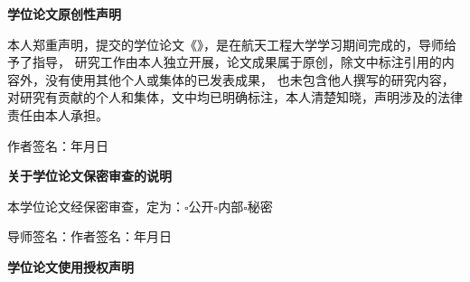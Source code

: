 \thispagestyle{empty}

\begin{center}
{\heiti\bfseries{} 学位论文原创性声明}
\end{center}

\vspace{0.3cm}

\kaishu{}
\setlength{\parindent}{2em}

本人郑重声明，提交的学位论文《\thesistitle》，是在航天工程大学学习期间完成的，导师给予了指导，
研究工作由本人独立开展，论文成果属于原创，除文中标注引用的内容外，没有使用其他个人或集体的已发表成果，
也未包含他人撰写的研究内容，对研究有贡献的个人和集体，文中均已明确标注，本人清楚知晓，声明涉及的法律责任由本人承担。

\vspace{0.8cm}

\begin{center}
\kaishu{}
作者签名：\qquad\qquad\qquad\qquad\qquad 年\qquad 月\qquad 日
\end{center}

\vspace{1cm}

\begin{center}
{\heiti\bfseries{} 关于学位论文保密审查的说明}
\end{center}

\vspace{0.3cm}

\begin{center}
\kaishu{}
本学位论文经保密审查，定为：$\square$公开\quad\quad$\square$内部\quad\quad$\square$秘密
\end{center}

\vspace{0.8cm}

\begin{center}
\kaishu{}
导师签名：\qquad\qquad\qquad 作者签名：\qquad\qquad\qquad 年\qquad 月\qquad 日
\end{center}

\vspace{1cm}

\begin{center}
{\heiti\bfseries{} 学位论文使用授权声明}
\end{center}

